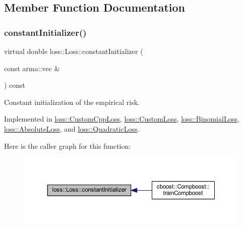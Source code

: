 \subsection{Member Function Documentation}
\mbox{\label{classloss_1_1_loss_a65fe7dcd9370e6a549b8d1cc95fc8798}} 
\subsubsection{\texorpdfstring{constant\+Initializer()}{constantInitializer()}}
{\footnotesize\ttfamily virtual double loss\+::\+Loss\+::constant\+Initializer (\begin{DoxyParamCaption}\item[{const arma\+::vec \&}]{ }\end{DoxyParamCaption}) const\hspace{0.3cm}{\ttfamily [pure virtual]}}



Constant initialization of the empirical risk. 



Implemented in \hyperlink{classloss_1_1_custom_cpp_loss_a7e3691161855a4a3152982274e74c96a}{loss\+::\+Custom\+Cpp\+Loss}, \hyperlink{classloss_1_1_custom_loss_adf283025a8511731504cd5b620cc8b37}{loss\+::\+Custom\+Loss}, \hyperlink{classloss_1_1_binomial_loss_a1292422a2b07c8ebe1b168375940b029}{loss\+::\+Binomial\+Loss}, \hyperlink{classloss_1_1_absolute_loss_aa2ac5fb1fdf3ce0f48decd77d375ef76}{loss\+::\+Absolute\+Loss}, and \hyperlink{classloss_1_1_quadratic_loss_a43989f3fbecc27351513afe1136cdf38}{loss\+::\+Quadratic\+Loss}.

Here is the caller graph for this function\+:\nopagebreak
\begin{figure}[H]
\begin{center}
\leavevmode
\includegraphics[width=350pt]{classloss_1_1_loss_a65fe7dcd9370e6a549b8d1cc95fc8798_icgraph}
\end{center}
\end{figure}
\mbox{\label{classloss_1_1_loss_a267a4de70747ade4b2d84ce35a448979}} 
